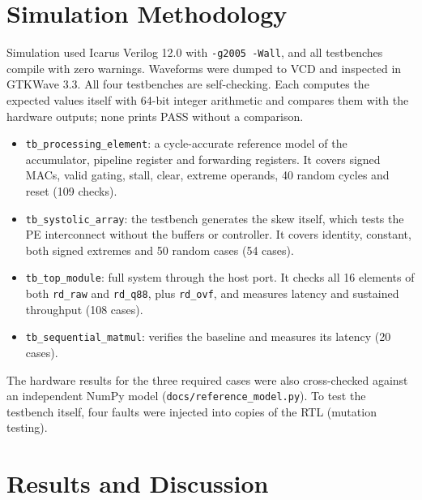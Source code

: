 \documentclass[conference]{IEEEtran}
\begin{document}
\section{Simulation Methodology}
Simulation used Icarus Verilog 12.0 with \texttt{-g2005 -Wall}, and all testbenches compile with zero warnings. Waveforms were dumped to VCD and inspected in GTKWave 3.3. All four testbenches are self-checking. Each computes the expected values itself with 64-bit integer arithmetic and compares them with the hardware outputs; none prints PASS without a comparison.
\begin{itemize}
\item \texttt{tb\_processing\_element}: a cycle-accurate reference model of the accumulator, pipeline register and forwarding registers. It covers signed MACs, valid gating, stall, clear, extreme operands, 40 random cycles and reset (109 checks).
\item \texttt{tb\_systolic\_array}: the testbench generates the skew itself, which tests the PE interconnect without the buffers or controller. It covers identity, constant, both signed extremes and 50 random cases (54 cases).
\item \texttt{tb\_top\_module}: full system through the host port. It checks all 16 elements of both \texttt{rd\_raw} and \texttt{rd\_q88}, plus \texttt{rd\_ovf}, and measures latency and sustained throughput (108 cases).
\item \texttt{tb\_sequential\_matmul}: verifies the baseline and measures its latency (20 cases).
\end{itemize}
The hardware results for the three required cases were also cross-checked against an independent NumPy model (\texttt{docs/reference\_model.py}). To test the testbench itself, four faults were injected into copies of the RTL (mutation testing).

\section{Results and Discussion}
\end{document}
